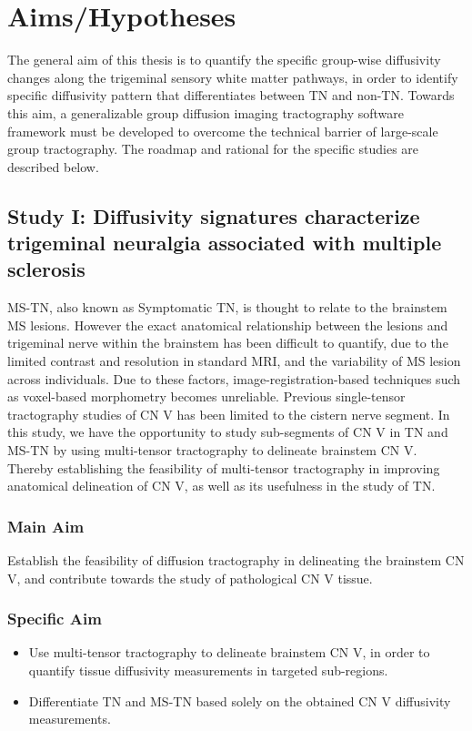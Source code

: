 \chapter{Aims/Hypotheses}

The general aim of this thesis is to quantify the specific group-wise diffusivity changes along the trigeminal sensory white matter pathways, in order to identify specific diffusivity pattern that differentiates between TN and non-TN. Towards this aim, a generalizable group diffusion imaging tractography software framework must be developed to overcome the technical barrier of large-scale group tractography. The roadmap and rational for the specific studies are described below.

\section{Study I: Diffusivity signatures characterize trigeminal neuralgia associated with multiple sclerosis}
MS-TN, also known as Symptomatic TN, is thought to relate to the brainstem MS lesions. However the exact anatomical relationship between the lesions and trigeminal nerve within the brainstem has been difficult to quantify, due to the limited contrast and resolution in standard MRI, and the variability of MS lesion across individuals. Due to these factors, image-registration-based techniques such as voxel-based morphometry becomes unreliable. Previous single-tensor tractography studies of CN V has been limited to the cistern nerve segment. In this study, we have the opportunity to study sub-segments of CN V in TN and MS-TN by using multi-tensor tractography to delineate brainstem CN V. Thereby establishing the feasibility of multi-tensor tractography in improving anatomical delineation of CN V, as well as its usefulness in the study of TN. 

\subsection{Main Aim} 
Establish the feasibility of diffusion tractography in delineating the brainstem CN V, and contribute towards the study of pathological CN V tissue.

\subsection{Specific Aim}
\begin{itemize}
    \item Use multi-tensor tractography to delineate brainstem CN V, in order to quantify tissue diffusivity measurements in targeted sub-regions.
    \item Differentiate TN and MS-TN based solely on the obtained CN V diffusivity measurements.
\end{itemize}

